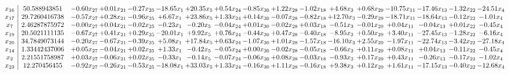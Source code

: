 \documentclass[9pt]{article}
\begin{document}
 \[\begin{array}{c| c c@{\hskip 2pt} c@{\hskip 2pt} c@{\hskip 2pt} c@{\hskip 2pt} c@{\hskip 2pt} c@{\hskip 2pt} c@{\hskip 2pt} c@{\hskip 2pt} c@{\hskip 2pt} c@{\hskip 2pt} c@{\hskip 2pt} c@{\hskip 2pt} c@{\hskip 2pt} c@{\hskip 2pt} c@{\hskip 2pt} }
 x_{16}   &  50.588943851 & -0.60 x_{27} & +  0.01 x_{21} & -0.27 x_{25} & -18.65 x_{1} & + 20.35 x_{5} & +  0.54 x_{24} & -0.85 x_{30} & +  1.22 x_{28} & -1.02 x_{18} & +  4.68 x_{3} & +  0.68 x_{29} & -10.75 x_{11} & -17.46 x_{13} & -1.32 x_{22} & -24.51 x_{4}\\
 x_{17}   &  29.7260416738 & -0.57 x_{27} & +  0.28 x_{21} & -0.96 x_{25} & +  6.67 x_{1} & + 23.86 x_{5} & +  1.33 x_{24} & +  0.14 x_{30} & -0.07 x_{28} & -0.82 x_{18} & + 12.70 x_{3} & -0.29 x_{29} & -18.71 x_{11} & -18.64 x_{13} & -0.12 x_{22} & -1.01 x_{4}\\
 x_{7}   &  2.46287875972 & -0.00 x_{27} & +  0.04 x_{21} & -0.02 x_{25} & -0.23 x_{1} & -0.20 x_{5} & -0.04 x_{24} & +  0.01 x_{30} & -0.02 x_{28} & +  0.03 x_{18} & -0.51 x_{3} & -0.01 x_{29} & +  0.04 x_{11} & -0.04 x_{13} & +  0.01 x_{22} & -0.45 x_{4}\\
 x_{19}   &  20.5021111135 & -0.67 x_{27} & +  0.41 x_{21} & +  0.29 x_{25} & -20.01 x_{1} & +  9.92 x_{5} & +  0.76 x_{24} & -0.44 x_{30} & +  0.47 x_{28} & -0.40 x_{18} & -8.95 x_{3} & +  0.50 x_{29} & +  3.40 x_{11} & -27.45 x_{13} & -1.28 x_{22} & -6.16 x_{4}\\
 x_{20}   &  34.7849073144 & -0.20 x_{27} & -0.67 x_{21} & -0.39 x_{25} & +  5.08 x_{1} & + 17.84 x_{5} & +  0.63 x_{24} & -1.07 x_{30} & +  1.01 x_{28} & -1.57 x_{18} & -16.10 x_{3} & +  2.55 x_{29} & -1.97 x_{11} & -22.74 x_{13} & -3.42 x_{22} & -27.18 x_{4}\\
 x_{14}   &  1.33442437006 & +  0.05 x_{27} & -0.04 x_{21} & +  0.02 x_{25} & +  1.33 x_{1} & -0.42 x_{5} & -0.05 x_{24} & +  0.00 x_{30} & -0.02 x_{28} & -0.05 x_{18} & -0.66 x_{3} & +  0.11 x_{29} & +  0.08 x_{11} & +  0.04 x_{13} & -0.11 x_{22} & -0.45 x_{4}\\
 x_{2}   &  2.21551758987 & +  0.03 x_{27} & -0.06 x_{21} & +  0.02 x_{25} & -0.33 x_{1} & -0.14 x_{5} & -0.07 x_{24} & -0.06 x_{30} & +  0.08 x_{28} & -0.03 x_{18} & -0.93 x_{3} & +  0.17 x_{29} & +  0.43 x_{11} & -0.26 x_{13} & -0.17 x_{22} & -1.02 x_{4}\\
 x_{23}   &  12.270456455 & -0.92 x_{27} & -0.26 x_{21} & -0.53 x_{25} & -18.08 x_{1} & + 33.03 x_{5} & +  1.33 x_{24} & -0.16 x_{30} & +  1.11 x_{28} & -0.16 x_{18} & +  9.38 x_{3} & +  0.12 x_{29} & +  1.61 x_{11} & -17.15 x_{13} & -0.40 x_{22} & -12.68 x_{4}\\

\end{array}\]
\end{document}
